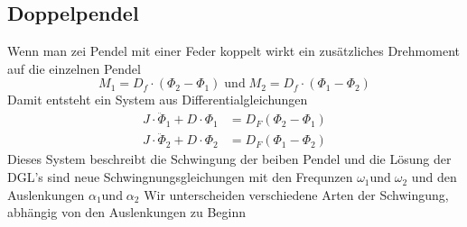 \subsection{Doppelpendel}
Wenn man zei Pendel mit einer Feder koppelt wirkt ein zusätzliches Drehmoment auf die einzelnen Pendel 
\begin{equation*}
    M_1 = D_f\cdot (\Phi_2-\Phi_1)\; \text{und} \;M_2=D_f\cdot (\Phi_1-\Phi_2)
\end{equation*}
Damit entsteht ein System aus Differentialgleichungen
\begin{align*}
    J\cdot \ddot{\Phi}_1 + D \cdot \Phi_1 &= D_F (\Phi_2 - \Phi_1) \\
    J\cdot \ddot{\Phi}_2 + D \cdot \Phi_2 &= D_F (\Phi_1 - \Phi_2)
\end{align*}
Dieses System beschreibt die Schwingung der beiben Pendel und die Lösung der DGL's sind neue Schwingnungsgleichungen mit den Frequnzen $\omega_1 \text{und} \;\omega_2$ und den  Auslenkungen $\alpha_1 \text{und}\; \alpha_2$
Wir unterscheiden verschiedene Arten der Schwingung, abhängig von den Auslenkungen zu Beginn
